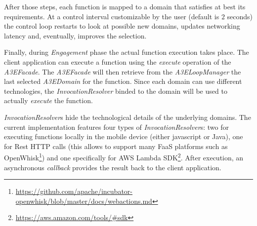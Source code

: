 After those steps, each function is mapped to a domain that satisfies at best its requirements. At a control interval customizable by the user (default is $2$ seconds) the control loop restarts to look at possible new domains, updates networking latency and, eventually, improves the selection.

Finally, during \textit{Engagement} phase the actual function execution takes place. The client application can execute a function using the \textit{execute} operation of the  \textit{A3EFacade}. %
The \textit{A3EFacade} will then retrieve from the \textit{A3ELoopManager} the last selected \textit{A3EDomain} for the function. Since each domain can use different technologies, the \textit{InvocationResolver} binded to the domain will be used to actually \textit{execute} the function.  

\textit{InvocationResolver}s hide the technological details of the underlying domains. %
The current implementation features four types of \textit{InvocationResolver}s: two for executing functions locally in the mobile device (either javascript or Java), one for Rest HTTP calls (this allows to support many FaaS platforms such as OpenWhisk\footnote{\url{https://github.com/apache/incubator-openwhisk/blob/master/docs/webactions.md}}) and one specifically for AWS Lambda SDK\footnote{\url{https://aws.amazon.com/tools/\#sdk}}. %
After execution, an asynchronous \textit{callback} provides the result back to the client application.

